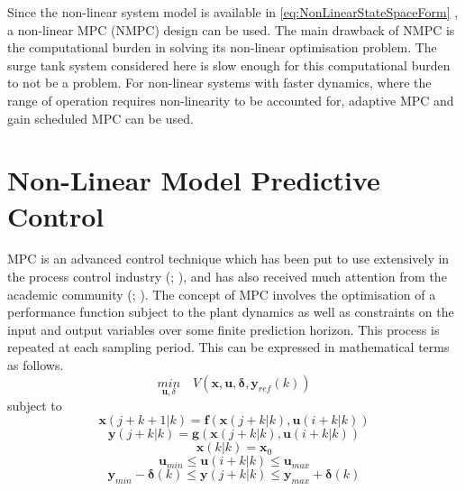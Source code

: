 \documentclass[preprint,authoryear,12pt]{elsarticle}
\begin{document}
Since the non-linear system model is available in \ref{eq:NonLinearStateSpaceForm}	, a non-linear MPC (NMPC) design can be used. The main drawback of NMPC is the computational burden in solving its non-linear optimisation problem. The surge tank system considered here is slow enough for this computational burden to not be a problem. For non-linear systems with faster dynamics, where the range of operation requires non-linearity to be accounted for, adaptive MPC \citep{Adetola2009} and gain scheduled MPC \citep{Vesely2015} can be used.

\section{Non-Linear Model Predictive Control}\label{sec:NonLinearMPC}
MPC is an advanced control technique which has been put to use extensively in the process control industry (\cite{Forbes2015}; \cite{Qin2003}), and has also received much attention from the academic community (\cite{Camacho1999}; \cite{Mayne2009}). The concept of MPC involves the optimisation of a performance function subject to the plant dynamics as well as constraints on the input and output variables over some finite prediction horizon. This process is repeated at each sampling period. This can be expressed in mathematical terms as follows.
\begin{displaymath}	
\underset{\mathbf{u},\delta}{min}\quad V(\mathbf{x}, \mathbf{u},\boldsymbol{\delta},\mathbf{y}_{ref}(k))
\end{displaymath}
subject to
\begin{displaymath}
\mathbf{x}(j+k+1|k)  = \mathbf{f}(\mathbf{x}(j+k|k),\mathbf{u}(i+k|k))
\end{displaymath}
\begin{displaymath}
\mathbf{y}(j+k|k)  = \mathbf{g}(\mathbf{x}(j+k|k),\mathbf{u}(i+k|k))
\end{displaymath}
\begin{displaymath}
\mathbf{x}(k|k) = \mathbf{x}_0
\end{displaymath}
\begin{displaymath}
\mathbf{u}_{min}\le \mathbf{u}(i+k|k) \le \mathbf{u}_{max} 
\end{displaymath}
\begin{displaymath}
\mathbf{y}_{min}-\boldsymbol{\delta}(k) \le \mathbf{y}(j+k|k) \le \mathbf{y}_{max}+\boldsymbol{\delta}(k) 
\end{displaymath}
\end{document}
